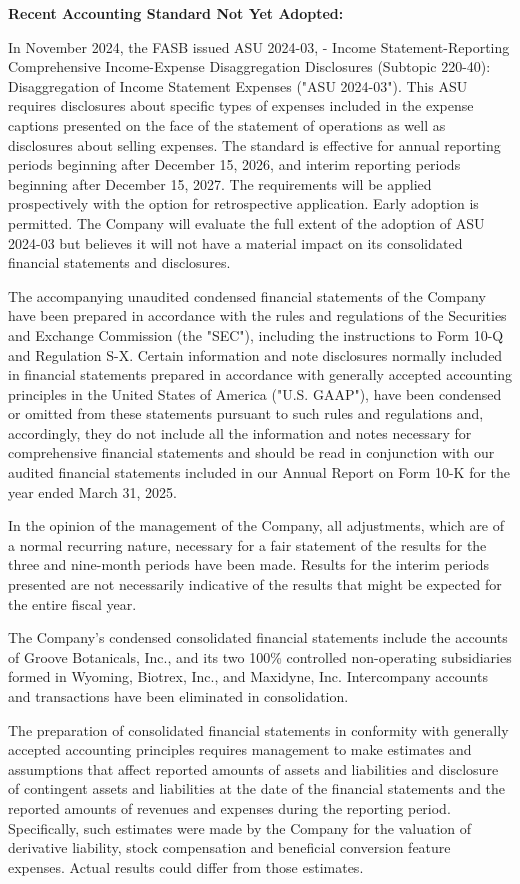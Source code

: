 \documentclass[11pt,a4paper]{article}
\begin{document}
\textbf{Recent Accounting Standard Not Yet Adopted:}

In November 2024, the FASB issued ASU 2024-03, - Income Statement-Reporting Comprehensive Income-Expense Disaggregation Disclosures (Subtopic 220-40): Disaggregation of Income Statement Expenses ("ASU 2024-03"). This ASU requires disclosures about specific types of expenses included in the expense captions presented on the face of the statement of operations as well as disclosures about selling expenses. The standard is effective for annual reporting periods beginning after December 15, 2026, and interim reporting periods beginning after December 15, 2027. The requirements will be applied prospectively with the option for retrospective application. Early adoption is permitted. The Company will evaluate the full extent of the adoption of ASU 2024-03 but believes it will not have a material impact on its consolidated financial statements and disclosures.

The accompanying unaudited condensed financial statements of the Company have been prepared in accordance with the rules and regulations of the Securities and Exchange Commission (the "SEC"), including the instructions to Form 10-Q and Regulation S-X. Certain information and note disclosures normally included in financial statements prepared in accordance with generally accepted accounting principles in the United States of America ("U.S. GAAP"), have been condensed or omitted from these statements pursuant to such rules and regulations and, accordingly, they do not include all the information and notes necessary for comprehensive financial statements and should be read in conjunction with our audited financial statements included in our Annual Report on Form 10-K for the year ended March 31, 2025.

In the opinion of the management of the Company, all adjustments, which are of a normal recurring nature, necessary for a fair statement of the results for the three and nine-month periods have been made. Results for the interim periods presented are not necessarily indicative of the results that might be expected for the entire fiscal year.

The Company's condensed consolidated financial statements include the accounts of Groove Botanicals, Inc., and its two 100\% controlled non-operating subsidiaries formed in Wyoming, Biotrex, Inc., and Maxidyne, Inc. Intercompany accounts and transactions have been eliminated in consolidation.

The preparation of consolidated financial statements in conformity with generally accepted accounting principles requires management to make estimates and assumptions that affect reported amounts of assets and liabilities and disclosure of contingent assets and liabilities at the date of the financial statements and the reported amounts of revenues and expenses during the reporting period. Specifically, such estimates were made by the Company for the valuation of derivative liability, stock compensation and beneficial conversion feature expenses. Actual results could differ from those estimates.
\end{document}
